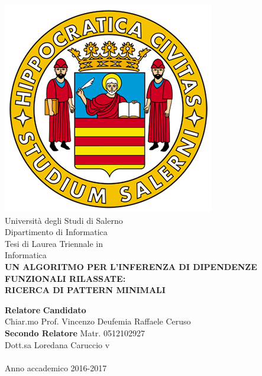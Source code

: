 \begin{center}
    \includegraphics[scale = 0.30]{Immagini/logoUnisa.png}\\
    \vspace{1cm}
    {\Large Università degli Studi di Salerno}\\[0.2truecm]
    {\large Dipartimento di Informatica}\\
    \hrulefill
    \vfill
    {\large Tesi di Laurea Triennale in }\\[0.2truecm]
    {\Large Informatica}\\
    \vfill
    {\large \bf UN ALGORITMO PER L'INFERENZA
    	DI DIPENDENZE FUNZIONALI RILASSATE:\\ 
        RICERCA DI PATTERN MINIMALI
    }
    \vfill\vfill
   
    
    {\bf Relatore} \hfill {\bf Candidato} 
    \\
    Chiar.mo Prof. Vincenzo Deufemia \hfill Raffaele Ceruso \\
    \vfill
    {\bf Secondo Relatore}
    \hfill Matr. 0512102927\\
    
    
    Dott.sa Loredana Caruccio  \hfill {\phantom v} \\
    \vspace{1cm}
    \hrulefill \\
    \vspace{1cm}
    Anno accademico 2016-2017
   
\end{center}